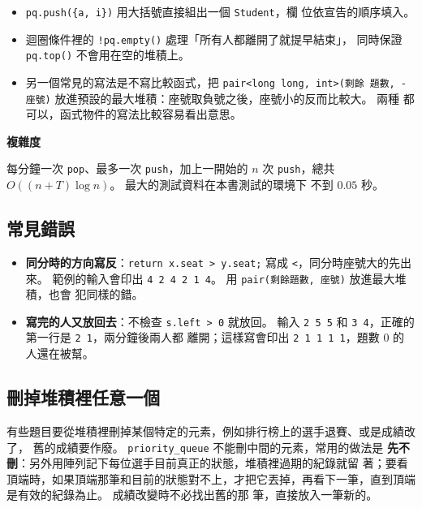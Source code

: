 
\begin{itemize}
\item \texttt{pq.push(\{a, i\})} 用大括號直接組出一個 \texttt{Student}，欄
位依宣告的順序填入。
\item 迴圈條件裡的 \texttt{!pq.empty()} 處理「所有人都離開了就提早結束」，
同時保證 \texttt{pq.top()} 不會用在空的堆積上。
\item 另一個常見的寫法是不寫比較函式，把 \texttt{pair<long long, int>(剩餘
題數, -座號)} 放進預設的最大堆積：座號取負號之後，座號小的反而比較大。 兩種
都可以，函式物件的寫法比較容易看出意思。
\end{itemize}

\textbf{複雜度}

每分鐘一次 \texttt{pop}、最多一次 \texttt{push}，加上一開始的 $n$ 次
\texttt{push}，總共 $O((n + T) \log n)$。 最大的測試資料在本書測試的環境下
不到 $0.05$ 秒。

\subsection{常見錯誤}

\begin{itemize}
\item \textbf{同分時的方向寫反}：\texttt{return x.seat > y.seat;} 寫成
\texttt{<}，同分時座號大的先出來。 範例的輸入會印出
\texttt{4 2 4 2 1 4}。 用 \texttt{pair(剩餘題數, 座號)} 放進最大堆積，也會
犯同樣的錯。
\item \textbf{寫完的人又放回去}：不檢查 \texttt{s.left > 0} 就放回。 輸入
\texttt{2 5 5} 和 \texttt{3 4}，正確的第一行是 \texttt{2 1}，兩分鐘後兩人都
離開；這樣寫會印出 \texttt{2 1 1 1 1}，題數 $0$ 的人還在被幫。
\end{itemize}

\subsection{刪掉堆積裡任意一個}
\label{sec:lazy}

有些題目要從堆積裡刪掉某個特定的元素，例如排行榜上的選手退賽、或是成績改了，
舊的成績要作廢。 \texttt{priority\_queue} 不能刪中間的元素，常用的做法是
\textbf{先不刪}：另外用陣列記下每位選手目前真正的狀態，堆積裡過期的紀錄就留
著；要看頂端時，如果頂端那筆和目前的狀態對不上，才把它丟掉，再看下一筆，直到頂端是有效的紀錄為止。 成績改變時不必找出舊的那
筆，直接放入一筆新的。

